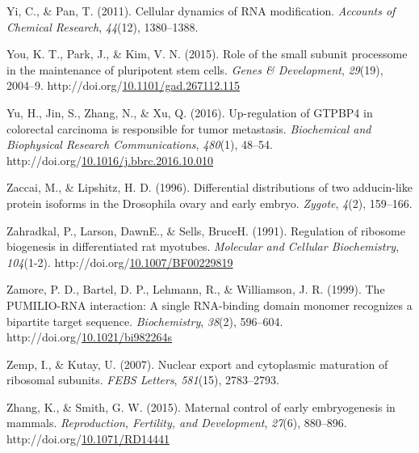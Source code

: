 \documentclass[12pt,oneside]{reedthesis}
\newlength{\cslhangindent}
\newenvironment{CSLReferences}[2] %
 {%
  \setlength{\parindent}{0pt}
  \ifodd #1 \everypar{\setlength{\hangindent}{\cslhangindent}}\ignorespaces\fi
  \ifnum #2 > 0
  \setlength{\parskip}{#2\baselineskip}
  \fi
 }%
 {}
\begin{document}
\begin{CSLReferences}{1}{0}
\leavevmode{}%
Yi, C., \& Pan, T. (2011). Cellular dynamics of {RNA} modification. \emph{Accounts of Chemical Research}, \emph{44}(12), 1380--1388.

\leavevmode{}%
You, K. T., Park, J., \& Kim, V. N. (2015). Role of the small subunit processome in the maintenance of pluripotent stem cells. \emph{Genes \& Development}, \emph{29}(19), 2004--9. http://doi.org/\href{https://doi.org/10.1101/gad.267112.115}{10.1101/gad.267112.115}

\leavevmode{}%
Yu, H., Jin, S., Zhang, N., \& Xu, Q. (2016). Up-regulation of {GTPBP4} in colorectal carcinoma is responsible for tumor metastasis. \emph{Biochemical and Biophysical Research Communications}, \emph{480}(1), 48--54. http://doi.org/\href{https://doi.org/10.1016/j.bbrc.2016.10.010}{10.1016/j.bbrc.2016.10.010}

\leavevmode{}%
Zaccai, M., \& Lipshitz, H. D. (1996). Differential distributions of two adducin-like protein isoforms in the {Drosophila} ovary and early embryo. \emph{Zygote}, \emph{4}(2), 159--166.

\leavevmode{}%
Zahradkal, P., Larson, DawnE., \& Sells, BruceH. (1991). Regulation of ribosome biogenesis in differentiated rat myotubes. \emph{Molecular and Cellular Biochemistry}, \emph{104}(1-2). http://doi.org/\href{https://doi.org/10.1007/BF00229819}{10.1007/BF00229819}

\leavevmode{}%
Zamore, P. D., Bartel, D. P., Lehmann, R., \& Williamson, J. R. (1999). The {PUMILIO-RNA} interaction: A single {RNA-binding} domain monomer recognizes a bipartite target sequence. \emph{Biochemistry}, \emph{38}(2), 596--604. http://doi.org/\href{https://doi.org/10.1021/bi982264s}{10.1021/bi982264s}

\leavevmode{}%
Zemp, I., \& Kutay, U. (2007). Nuclear export and cytoplasmic maturation of ribosomal subunits. \emph{FEBS Letters}, \emph{581}(15), 2783--2793.

\leavevmode{}%
Zhang, K., \& Smith, G. W. (2015). Maternal control of early embryogenesis in mammals. \emph{Reproduction, Fertility, and Development}, \emph{27}(6), 880--896. http://doi.org/\href{https://doi.org/10.1071/RD14441}{10.1071/RD14441}


\end{CSLReferences}
\end{document}

